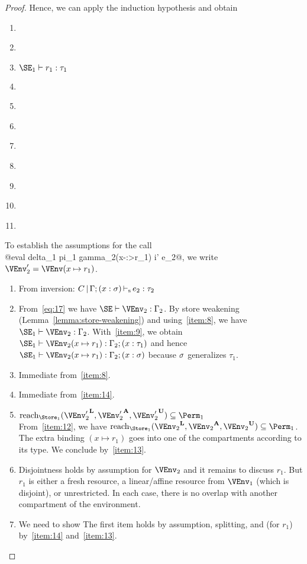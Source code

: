 \begin{proof}
  Hence, we can apply the induction hypothesis and obtain
  \begin{enumerate}[({R1-}1)]
  \item {}
  \item\label{item:8} 
  \item\label{item:9} $\SE_1 \vdash r_1 : \tau_1$
  \item\label{item:14} 
  \item\label{item:13} 
  \item\label{item:16} 
  \item\label{item:24} 
  \item\label{item:26} 
  \item\label{item:28} 
  \item\label{item:30} 
  \item\label{item:10} 
  \end{enumerate}
  To establish the assumptions for the call \\
  @eval delta_1 pi_1 gamma_2(x-:>r_1) i' e_2@,
  we write $\VEnv_2' = \VEnv (x \mapsto r_1)$.
  \begin{enumerate}[({A2-}1)]
  \item From inversion: $C \operatorname{|} \Gamma;(x : \sigma) \operatorname{\vdash_s} e_2 : \tau_2$
  \item From~\eqref{eq:17} we have $\SE \vdash \VEnv_2 : \E_2$.
    By store weakening (Lemma~\ref{lemma:store-weakening}) and
    using~\ref{item:8}, we have
    $\SE_1 \vdash \VEnv_2 : \E_2$.
    With~\ref{item:9}, we obtain
    $\SE_1 \vdash \VEnv_2 (x \mapsto r_1 ) : \E_2;\bvar x {\tau_1}$
    and hence
    $\SE_1 \vdash \VEnv_2 (x \mapsto r_1 ) : \E_2;\bvar x {\schm}$
    because $\sigma$ generalizes $\tau_1$.
  \item Immediate from~\ref{item:8}.
  \item Immediate from~\ref{item:14}.
  \item $\Reach{\Store_1}{\Active{\VEnv_2'}, \MutableBorrows{\VEnv_2'},
      \ImmutableBorrows{\VEnv_2'}} \subseteq \Perm_1$ \\
    From~\ref{item:12}, we have
     $\Reach{\Store_1}{\Active{\VEnv_2}, \MutableBorrows{\VEnv_2},
      \ImmutableBorrows{\VEnv_2}} \subseteq \Perm_1$. The extra
    binding $(x \mapsto r_1)$ goes into one of the compartments
    according to its type. We conclude by~\ref{item:13}.
  \item Disjointness holds by assumption for $\VEnv_2$ and it remains
    to discuss $r_1$. But $r_1$ is either a fresh resource, a
    linear/affine resource from $\VEnv_1$ (which is disjoint), or
    unrestricted. In each case, there is no overlap with another
    compartment of the environment.
  \item We need to show
    The first item holds by assumption, splitting, and (for $r_1$)
    by~\ref{item:14} and~\ref{item:13}.


\end{enumerate}
\end{proof}
